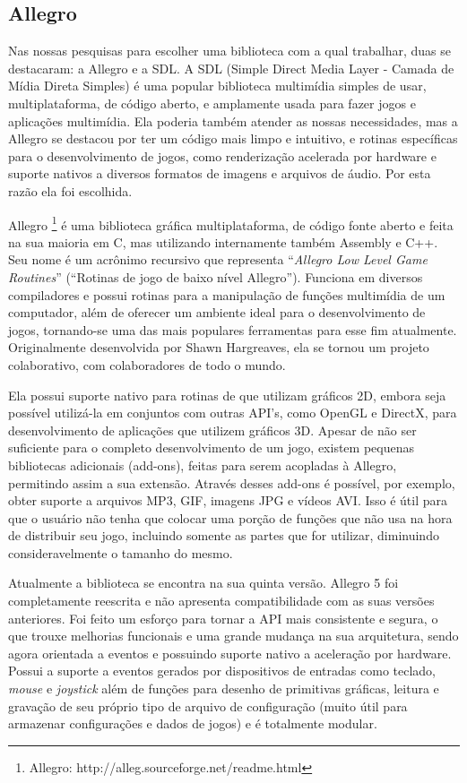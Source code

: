 \subsection{Allegro}
\label{allegro}
%
Nas nossas pesquisas para escolher uma biblioteca com a qual trabalhar, duas se destacaram: a Allegro e a SDL. A SDL (Simple Direct Media Layer - 
Camada de Mídia Direta Simples) é uma popular biblioteca multimídia simples de usar, multiplataforma, de código aberto, e amplamente usada para fazer  jogos e aplicações multimídia. Ela poderia também atender as nossas necessidades, mas a Allegro se destacou por ter um código mais limpo e intuitivo, e rotinas específicas para o desenvolvimento de jogos, como renderização acelerada por hardware e suporte nativos a diversos formatos de imagens e arquivos de áudio. Por esta razão ela foi escolhida.
\par 
Allegro \footnote{Allegro: http://alleg.sourceforge.net/readme.html} é uma biblioteca gráfica multiplataforma, de código fonte aberto e feita na sua maioria em C, mas utilizando internamente também Assembly e C++. Seu nome é um acrônimo recursivo que representa ``\textit{Allegro Low Level Game Routines}'' (``Rotinas de jogo de baixo nível Allegro''). Funciona em diversos compiladores e possui rotinas para a manipulação de funções multimídia de um computador, além de oferecer um ambiente ideal para o desenvolvimento de jogos, tornando-se uma das mais populares ferramentas para esse fim atualmente. Originalmente desenvolvida por Shawn Hargreaves, ela se tornou um projeto colaborativo, com colaboradores de todo o mundo.
\par
Ela possui suporte nativo para rotinas de que utilizam gráficos 2D, embora seja possível utilizá-la em conjuntos com outras API's, como OpenGL e DirectX, para desenvolvimento de aplicações que utilizem gráficos 3D. Apesar de não ser suficiente para o completo desenvolvimento 
de um jogo, existem pequenas bibliotecas adicionais (add-ons), feitas para serem acopladas à Allegro, permitindo assim a sua extensão. Através 
desses add-ons é possível, por exemplo, obter suporte a arquivos MP3, GIF, imagens JPG e vídeos AVI. Isso é útil para que o usuário não tenha que colocar uma porção de funções que não usa na hora de distribuir seu jogo, incluindo somente as partes que for utilizar, diminuindo consideravelmente o tamanho do mesmo.
\par
Atualmente a biblioteca se encontra na sua quinta versão. Allegro 5 foi completamente reescrita e não apresenta compatibilidade com as suas versões anteriores. Foi feito um esforço para tornar a API mais consistente e segura, o que trouxe melhorias funcionais e uma grande mudança na sua arquitetura, sendo agora orientada a eventos e possuindo suporte nativo a aceleração por hardware. Possui a suporte a eventos gerados por dispositivos de entradas como teclado, \textit{mouse} e \textit{joystick} além de funções para desenho de primitivas gráficas, leitura e gravação de seu próprio tipo de arquivo de configuração (muito útil para armazenar configurações e dados de jogos) e é totalmente modular.
